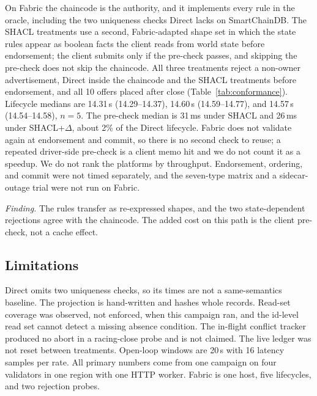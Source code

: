 \documentclass[sigconf,anonymous,review]{acmart}
\begin{document}
On Fabric the chaincode is the authority, and it implements every rule in
the oracle, including the two uniqueness checks Direct lacks on SmartChainDB.
The SHACL treatments use a second, Fabric-adapted shape set in which the
state rules appear as boolean facts the client reads from world state before
endorsement; the client submits only if the pre-check passes, and skipping
the pre-check does not skip the chaincode. All three treatments reject a
non-owner advertisement, Direct inside the chaincode and the SHACL treatments
before endorsement, and all 10 offers placed after close
(Table~\ref{tab:conformance}). Lifecycle medians are 14.31\,s (14.29--14.37),
14.60\,s (14.59--14.77), and 14.57\,s (14.54--14.58), $n{=}5$. The pre-check
median is 31\,ms under SHACL and 26\,ms under SHACL+$\Delta$, about 2\% of
the Direct lifecycle. Fabric does not validate again at endorsement and
commit, so there is no second check to reuse; a repeated driver-side pre-check
is a client memo hit and we do not count it as a speedup. We do not rank the
platforms by throughput. Endorsement, ordering, and commit were not timed
separately, and the seven-type matrix and a sidecar-outage trial were not run
on Fabric.

\emph{Finding.} The rules transfer as re-expressed shapes, and the two
state-dependent rejections agree with the chaincode. The added cost on this
path is the client pre-check, not a cache effect.

\subsection{Limitations}
\label{sec:threats}

Direct omits two uniqueness checks, so its times are not a same-semantics
baseline. The projection is hand-written and hashes whole records. Read-set
coverage was observed, not enforced, when this campaign ran, and the id-level
read set cannot detect a missing absence condition. The in-flight conflict
tracker produced no abort in a racing-close probe and is not claimed. The
live ledger was not reset between treatments. Open-loop windows are 20\,s
with 16 latency samples per rate. All primary numbers come from one campaign
on four validators in one region with one HTTP worker. Fabric is one host,
five lifecycles, and two rejection probes.
\end{document}
